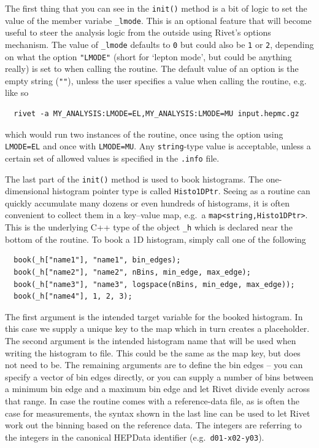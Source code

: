 \documentclass[10pt,fleqn]{scrartcl}
\theoremstyle{exstyle}
\begin{document}
The first thing that you can see in the \verb|init()| method is a bit of logic
to set the value of the member variabe \verb|_lmode|. 
This is an optional feature that will become useful to steer the analysis logic 
from the outside using Rivet's options mechanism. The value of \verb|_lmode| 
defaults to \verb|0| but could also be \verb|1| or \verb|2|, depending on what the option \verb|"LMODE"|
(short for `lepton mode', but could be anything really) is set to when calling the routine.
The default value of an option is the empty string (\verb|""|), unless the user specifies
a value when calling the routine, e.g. like so
\begin{verbatim}
  rivet -a MY_ANALYSIS:LMODE=EL,MY_ANALYSIS:LMODE=MU input.hepmc.gz
\end{verbatim}
which would run two instances of the routine, once using the option using \verb|LMODE=EL| and
once with \verb|LMODE=MU|. Any \verb|string|-type value is acceptable, unless
a certain set of allowed values is specified in the \verb|.info| file.

The last part of the \verb|init()| method is used to book histograms. 
The one-dimensional histogram pointer type is called \verb|Histo1DPtr|.
Seeing as a routine can quickly accumulate many dozens or even hundreds
of histograms, it is often convenient to collect them in a key--value
map, e.g.\ a \verb|map<string,Histo1DPtr>|. This is the underlying
C++ type of the object \verb|_h| which is declared near the bottom of the routine.
To book a 1D histogram, simply call one of the following
\begin{verbatim}
  book(_h["name1"], "name1", bin_edges);
  book(_h["name2"], "name2", nBins, min_edge, max_edge);
  book(_h["name3"], "name3", logspace(nBins, min_edge, max_edge));
  book(_h["name4"], 1, 2, 3);
\end{verbatim}
The first argument is the intended target variable for the booked histogram.
In this case we supply a unique key to the map which in turn creates a placeholder.
The second argument is the intended histogram name that will be used when
writing the histogram to file. This could be the same as the map key, 
but does not need to be. The remaining arguments are to define the bin edges
-- you can specify a vector of bin edges directly, or you can supply a number 
of bins between a minimum bin edge and a maximum bin edge and let Rivet divide 
evenly across that range.
In case the routine comes with a reference-data file, as is often the case
for measurements, the syntax shown in the last line can be used to let Rivet
work out the binning based on the reference data. The integers are referring
to the integers in the canonical HEPData identifier (e.g.\ \verb|d01-x02-y03|).
\end{document}
